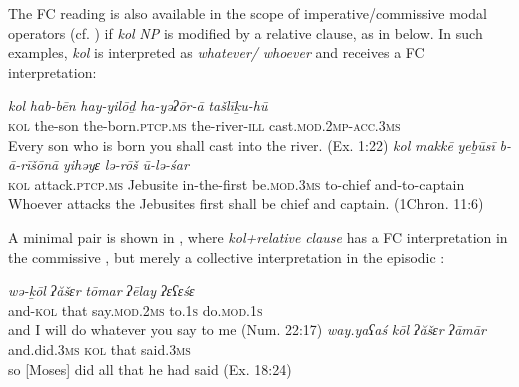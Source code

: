 \documentclass[output=paper]{langsci/langscibook}
\begin{document}
The FC reading is also available in the scope of imperative/commissive modal operators (cf. \citealt{Dayal2013}) if \textit{kol} \textit{NP} is modified by a relative clause, as in  below. In such examples, \textit{kol} is interpreted as \textit{whatever/} \textit{whoever} and receives a FC interpretation:

\ea%
    \label{ex:doron:54}
    \ea
    \gll \textit{kol}   \textit{hab-bēn} \textit{hay-yilōḏ}                 \textit{ha-yəʔōr-ā}     \textit{tašlīḵu-hū}\\
         \textsc{kol} the-son  the-born.\textsc{ptcp.ms}  the-river-\textsc{ill}  cast.\textsc{mod.2mp-acc.3ms} \\
    \glt Every son who is born you shall cast into the river. (Ex. 1:22)
    \ex  
    \gll \textit{kol}   \textit{makkē}                 \textit{yeḇūsī}    \textit{b-ā-rīšōnā}     \textit{yihǝyɛ}            \textit{lə-rōš}     \textit{ū-lə-śar}\\
         \textsc{kol} attack.\textsc{ptcp.ms}  Jebusite  in-the-first  be.\textsc{mod.3ms} to-chief  and-to-captain\\
    \glt Whoever attacks the Jebusites first shall be\textsuperscript{} chief and captain. (1Chron. 11:6) 
    \z
\z

A minimal pair is shown in , where \textit{kol+relative} \textit{clause} has a FC interpretation in the commissive , but merely a collective interpretation in the episodic :  

\ea%
    \label{ex:doron:55}
    \ea
    \gll \textit{wə-ḵōl}     \textit{ʔăšɛr}  \textit{tōmar}               \textit{ʔēlay}     \textit{ʔɛʕɛśɛ}\\
         and-\textsc{kol}  that    say.\textsc{mod}.\textsc{2ms}   to.\textsc{1s}     do.\textsc{mod.1s}\\
    \glt and I will do whatever you say to me (Num. 22:17)
    \ex  
    \gll \textit{way.yaʕaś}      \textit{kōl}   \textit{ʔăšɛr}  \textit{ʔāmār} \\
         and.did.\textsc{3ms}   \textsc{kol} that     said.\textsc{3ms}\\
    \glt so [Moses] did all that he had said (Ex. 18:24)
    \z
\z
\end{document}
